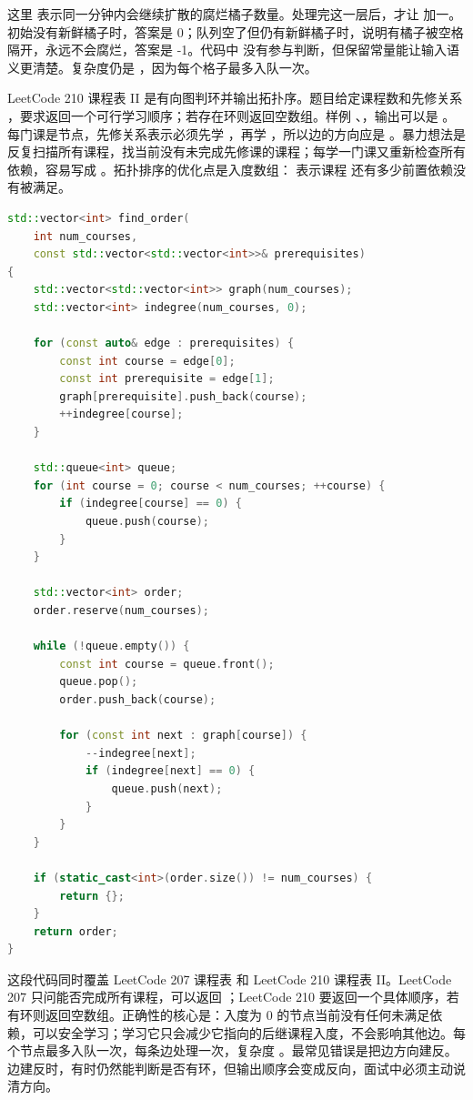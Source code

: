 这里  表示同一分钟内会继续扩散的腐烂橘子数量。处理完这一层后，才让  加一。初始没有新鲜橘子时，答案是 0；队列空了但仍有新鲜橘子时，说明有橘子被空格隔开，永远不会腐烂，答案是 -1。代码中  没有参与判断，但保留常量能让输入语义更清楚。复杂度仍是 ，因为每个格子最多入队一次。

LeetCode 210 课程表 II 是有向图判环并输出拓扑序。题目给定课程数和先修关系 ，要求返回一个可行学习顺序；若存在环则返回空数组。样例 、，输出可以是 \code{[0,1]}。每门课是节点，先修关系表示必须先学 ，再学 ，所以边的方向应是 。暴力想法是反复扫描所有课程，找当前没有未完成先修课的课程；每学一门课又重新检查所有依赖，容易写成 。拓扑排序的优化点是入度数组： 表示课程  还有多少前置依赖没有被满足。

\begin{lstlisting}[language=C++,caption={LeetCode 210 课程表 II：拓扑排序输出可行学习顺序}]
std::vector<int> find_order(
    int num_courses,
    const std::vector<std::vector<int>>& prerequisites)
{
    std::vector<std::vector<int>> graph(num_courses);
    std::vector<int> indegree(num_courses, 0);

    for (const auto& edge : prerequisites) {
        const int course = edge[0];
        const int prerequisite = edge[1];
        graph[prerequisite].push_back(course);
        ++indegree[course];
    }

    std::queue<int> queue;
    for (int course = 0; course < num_courses; ++course) {
        if (indegree[course] == 0) {
            queue.push(course);
        }
    }

    std::vector<int> order;
    order.reserve(num_courses);

    while (!queue.empty()) {
        const int course = queue.front();
        queue.pop();
        order.push_back(course);

        for (const int next : graph[course]) {
            --indegree[next];
            if (indegree[next] == 0) {
                queue.push(next);
            }
        }
    }

    if (static_cast<int>(order.size()) != num_courses) {
        return {};
    }
    return order;
}
\end{lstlisting}

这段代码同时覆盖 LeetCode 207 课程表 和 LeetCode 210 课程表 II。LeetCode 207 只问能否完成所有课程，可以返回 ；LeetCode 210 要返回一个具体顺序，若有环则返回空数组。正确性的核心是：入度为 0 的节点当前没有任何未满足依赖，可以安全学习；学习它只会减少它指向的后继课程入度，不会影响其他边。每个节点最多入队一次，每条边处理一次，复杂度 。最常见错误是把边方向建反。边建反时，有时仍然能判断是否有环，但输出顺序会变成反向，面试中必须主动说清方向。

